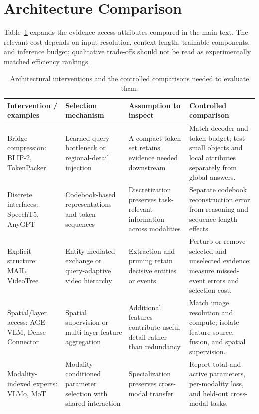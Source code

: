 \documentclass[10pt,onecolumn,journal,compsoc]{IEEEtran}
\begin{document}
\section{Architecture Comparison}
Table~\ref{tab:supp-architecture} expands the evidence-access attributes compared in the main text. The relevant cost depends on input resolution, context length, trainable components, and inference budget; qualitative trade-offs should not be read as experimentally matched efficiency rankings.
\begin{table}[H]
\caption{Architectural interventions and the controlled comparisons needed to evaluate them.}
\label{tab:supp-architecture}
\centering\small
\setlength{\tabcolsep}{5pt}\renewcommand{\arraystretch}{1.22}
\begin{tabularx}{\textwidth}{>{\raggedright\arraybackslash}p{}XXX}
\toprule\rowcolor{surveyheader}
\textbf{Intervention / examples} & \textbf{Selection mechanism} & \textbf{Assumption to inspect} & \textbf{Controlled comparison}\\\midrule
Bridge compression: BLIP-2, TokenPacker~\cite{li2023blip2,li2025tokenpacker} & Learned query bottleneck or regional-detail injection & A compact token set retains evidence needed downstream & Match decoder and token budget; test small objects and local attributes separately from global answers.\\
Discrete interfaces: SpeechT5, AnyGPT~\cite{ao2022speecht5,zhan2024anygpt} & Codebook-based representations and token sequences & Discretization preserves task-relevant information across modalities & Separate codebook reconstruction error from reasoning and sequence-length effects.\\
Explicit structure: MAIL, VideoTree~\cite{dong2024modality,wang2025videotree} & Entity-mediated exchange or query-adaptive video hierarchy & Extraction and pruning retain decisive entities or events & Perturb or remove selected and unselected evidence; measure missed-event errors and selection cost.\\
Spatial/layer access: AGE-VLM, Dense Connector~\cite{mahajan2025attention,yao2024dense} & Spatial supervision or multi-layer feature aggregation & Additional features contribute useful detail rather than redundancy & Match image resolution and compute; isolate feature source, fusion, and spatial supervision.\\
Modality-indexed experts: VLMo, MoT~\cite{bao2022vlmo,liang2024mixture} & Modality-conditioned parameter selection with shared interaction & Specialization preserves cross-modal transfer & Report total and active parameters, per-modality loss, and held-out cross-modal tasks.\\

\end{tabularx}
\end{table}
\end{document}

